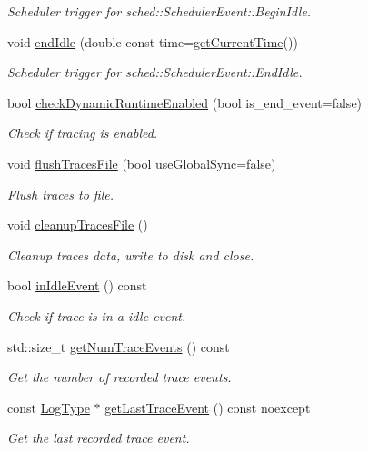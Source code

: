 \begin{DoxyCompactItemize}
\begin{DoxyCompactList}\small\item\em Scheduler trigger for {\ttfamily sched\+::\+Scheduler\+Event\+::\+Begin\+Idle}. \end{DoxyCompactList}\item 
void \hyperlink{structvt_1_1trace_1_1_trace_lite_a72c44d3d5e8361560104f8b91332a22c}{end\+Idle} (double const time=\hyperlink{structvt_1_1trace_1_1_trace_lite_ad1d8159d645a3b7047ce3f2e0c080f8d}{get\+Current\+Time}())
\begin{DoxyCompactList}\small\item\em Scheduler trigger for {\ttfamily sched\+::\+Scheduler\+Event\+::\+End\+Idle}. \end{DoxyCompactList}\item 
bool \hyperlink{structvt_1_1trace_1_1_trace_lite_a8c80920e23cef1aeedbb2282fb6769f2}{check\+Dynamic\+Runtime\+Enabled} (bool is\+\_\+end\+\_\+event=false)
\begin{DoxyCompactList}\small\item\em Check if tracing is enabled. \end{DoxyCompactList}\item 
void \hyperlink{structvt_1_1trace_1_1_trace_lite_a31513ed82d3b3c74369fde81491eb3a2}{flush\+Traces\+File} (bool use\+Global\+Sync=false)
\begin{DoxyCompactList}\small\item\em Flush traces to file. \end{DoxyCompactList}\item 
void \hyperlink{structvt_1_1trace_1_1_trace_lite_ac412f235b5e5b4510d848fa0b3b6a539}{cleanup\+Traces\+File} ()
\begin{DoxyCompactList}\small\item\em Cleanup traces data, write to disk and close. \end{DoxyCompactList}\item 
bool \hyperlink{structvt_1_1trace_1_1_trace_lite_ad3b81920d008e46dff0eb205ca99bd22}{in\+Idle\+Event} () const
\begin{DoxyCompactList}\small\item\em Check if trace is in a idle event. \end{DoxyCompactList}\item 
std\+::size\+\_\+t \hyperlink{structvt_1_1trace_1_1_trace_lite_a01b746338f535ac1df0566f9705e2d1e}{get\+Num\+Trace\+Events} () const
\begin{DoxyCompactList}\small\item\em Get the number of recorded trace events. \end{DoxyCompactList}\item 
const \hyperlink{structvt_1_1trace_1_1_trace_lite_aeb73e523d31829d3163c877b145afa2a}{Log\+Type} $\ast$ \hyperlink{structvt_1_1trace_1_1_trace_lite_a356f20b9186cf0ed1fdc9881186c9f49}{get\+Last\+Trace\+Event} () const noexcept
\begin{DoxyCompactList}\small\item\em Get the last recorded trace event. \end{DoxyCompactList}\end{DoxyCompactItemize}
